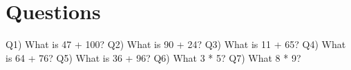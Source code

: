 \documentclass{article}%
\begin{document}
%
\normalsize%
\section{Questions}%
\label{sec:Questions}%
Q1)  What is 47 + 100?%
\newline%
\newline%
\newline%
\newline%
\newline%
\newline%
\newline%
%
Q2)  What is 90 + 24?%
\newline%
\newline%
\newline%
\newline%
\newline%
\newline%
\newline%
%
Q3)  What is 11 + 65?%
\newline%
\newline%
\newline%
\newline%
\newline%
\newline%
\newline%
%
Q4)  What is 64 + 76?%
\newline%
\newline%
\newline%
\newline%
\newline%
\newline%
\newline%
%
Q5)  What is 36 + 96?%
\newline%
\newline%
\newline%
\newline%
\newline%
\newline%
\newline%
%
Q6)  What 3 * 5?%
\newline%
\newline%
\newline%
\newline%
\newline%
\newline%
\newline%
%
Q7)  What 8 * 9?%
\newline%
\newline%
\newline%
\end{document}
